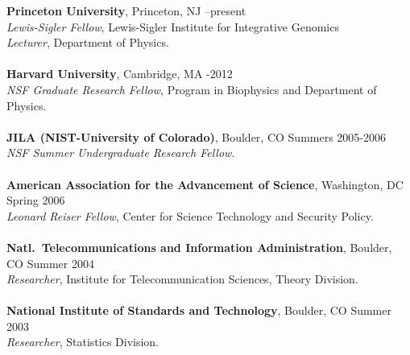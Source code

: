 \documentclass[11pt]{article}
\makeatletter
\renewcommand{\section}{\@startsection
{section}%
{1}%
{0mm}%
{2\baselineskip}%
{0.5\baselineskip}%
{\normalfont\bf\MakeUppercase}} %
\makeatother
\begin{document}
{\bf Princeton University}, Princeton, NJ  --present\\
{\it Lewis-Sigler Fellow}, Lewis-Sigler Institute for Integrative Genomics\\ 
{\it Lecturer}, Department of Physics.\\
\\
{\bf Harvard University}, 
Cambridge, MA  -2012\\
{\it NSF Graduate Research Fellow}, Program in Biophysics and Department of Physics.\\
\\
{\bf JILA (NIST-University of Colorado)}, Boulder, CO   \dotfill Summers 2005-2006\\
{\it NSF Summer Undergraduate Research Fellow}.\\
\\
{\bf American Association for the Advancement of Science}, Washington, DC  \dotfill Spring 2006\\
{\it Leonard Reiser Fellow}, Center for Science Technology and Security Policy.\\
\\
{\bf Natl.~Telecommunications and Information Administration}, Boulder, CO  \dotfill Summer 2004\\
{\it Researcher}, Institute for Telecommunication Sciences, Theory Division.\\
\\
{\bf National Institute of Standards and Technology}, Boulder, CO  \dotfill Summer 2003\\
{\it Researcher}, Statistics Division.\\
\end{document}
